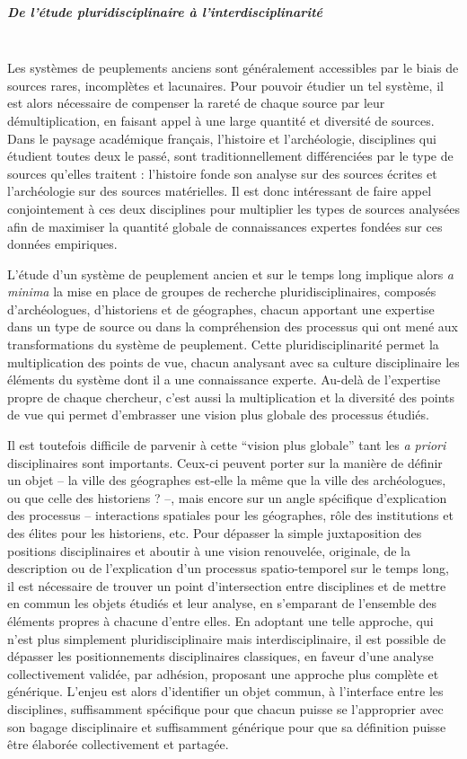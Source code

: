 \subparagraph{De l'étude pluridisciplinaire à l'interdisciplinarité}\mbox{}\\
Les systèmes de peuplements anciens sont généralement accessibles par le biais de sources rares, incomplètes et lacunaires.
Pour pouvoir étudier un tel système, il est alors nécessaire de compenser la rareté de chaque source par leur démultiplication, en faisant appel à une large quantité et diversité de sources.
Dans le paysage académique français, l'histoire et l'archéologie, disciplines qui étudient toutes deux le passé, sont traditionnellement différenciées par le type de sources qu'elles traitent :
	l'histoire fonde son analyse sur des sources écrites et l'archéologie sur des sources matérielles.
Il est donc intéressant de faire appel conjointement à ces deux disciplines pour multiplier les types de sources analysées afin de maximiser la quantité globale de connaissances expertes fondées sur ces données empiriques.

L'étude d'un système de peuplement ancien et sur le temps long implique alors \textit{a minima} la mise en place de groupes de recherche pluridisciplinaires, composés d'archéologues, d'historiens et de géographes, chacun apportant une expertise dans un type de source ou dans la compréhension des processus qui ont mené aux transformations du système de peuplement.
Cette pluridisciplinarité permet la multiplication des points de vue, chacun analysant avec sa culture disciplinaire les éléments du système dont il a une connaissance experte.
Au-delà de l'expertise propre de chaque chercheur, c'est aussi la multiplication et la diversité des points de vue qui permet d'embrasser une vision plus globale des processus étudiés.

Il est toutefois difficile de parvenir à cette “vision plus globale” tant les \textit{a priori} disciplinaires sont importants.
Ceux-ci peuvent porter sur la manière de définir un objet – la ville des géographes est-elle la même que la ville des archéologues, ou que celle des historiens ? –, mais encore sur un angle spécifique d'explication des processus – interactions spatiales pour les géographes, rôle des institutions et des élites pour les historiens, etc.
Pour dépasser la simple juxtaposition des positions disciplinaires et aboutir à une vision renouvelée, originale, de la description ou de l'explication d'un processus spatio-temporel sur le temps long, il est nécessaire de trouver un point d'intersection entre disciplines et de mettre en commun les objets étudiés et leur analyse, en s'emparant de l'ensemble des éléments propres à chacune d'entre elles.
En adoptant une telle approche, qui n'est plus simplement pluridisciplinaire mais interdisciplinaire, il est possible de dépasser les positionnements disciplinaires classiques, en faveur d'une analyse collectivement validée, par adhésion, proposant une approche plus complète et générique.
L'enjeu est alors d'identifier un objet commun, à l'interface entre les disciplines, suffisamment spécifique pour que chacun puisse se l'approprier avec son bagage disciplinaire et suffisamment générique pour que sa définition puisse être élaborée collectivement et partagée.

